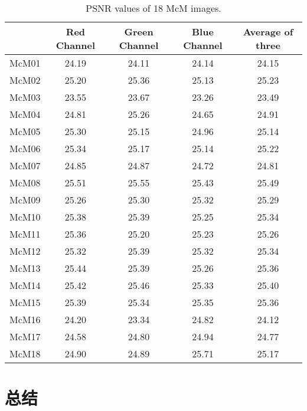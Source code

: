 \documentclass[10.5pt]{myarticle}
\begin{document}
\begin{table}[H]
	\centering
	\caption{PSNR values of 18 McM images.}
	\label{tab:result_task4}
	\begin{tabular}{|c|c|c|c|c|}
		\hline
		 & Red Channel & Green Channel & Blue Channel & Average of three \\ \hline
		McM01 & 24.19  & 24.11  & 24.14  & 24.15   \\ \hline
		McM02 & 25.20  & 25.36  & 25.13  & 25.23   \\ \hline
		McM03 & 23.55  & 23.67  & 23.26  & 23.49   \\ \hline
		McM04 & 24.81  & 25.26  & 24.65  & 24.91   \\ \hline
		McM05 & 25.30  & 25.15  & 24.96  & 25.14   \\ \hline
		McM06 & 25.34  & 25.17  & 25.14  & 25.22   \\ \hline
		McM07 & 24.85  & 24.87  & 24.72  & 24.81   \\ \hline
		McM08 & 25.51  & 25.55  & 25.43  & 25.49   \\ \hline
		McM09 & 25.26  & 25.30  & 25.32  & 25.29   \\ \hline
		McM10 & 25.38  & 25.39  & 25.25  & 25.34   \\ \hline
		McM11 & 25.36  & 25.20  & 25.23  & 25.26   \\ \hline
		McM12 & 25.32  & 25.39  & 25.32  & 25.34   \\ \hline
		McM13 & 25.44  & 25.39  & 25.26  & 25.36   \\ \hline
		McM14 & 25.42  & 25.46  & 25.33  & 25.40   \\ \hline
		McM15 & 25.39  & 25.34  & 25.35  & 25.36   \\ \hline
		McM16 & 24.20  & 23.34  & 24.82  & 24.12   \\ \hline
		McM17 & 24.58  & 24.80  & 24.94  & 24.77   \\ \hline
		McM18 & 24.90  & 24.89  & 25.71  & 25.17   \\ \hline
	\end{tabular}
\end{table}

\clearpage

\section{总结}
\end{document}

